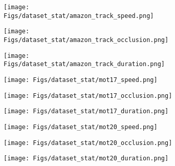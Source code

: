 \documentclass[runningheads]{llncs}
\begin{document}
\begin{figure}[t!]
\centering

    \begin{subfigure}{0.25\textwidth}
        \centering
        \texttt{[image: Figs/dataset\_stat/amazon\_track\_speed.png]}
    \end{subfigure}\begin{subfigure}{0.25\textwidth}
        \centering
        \texttt{[image: Figs/dataset\_stat/amazon\_track\_occlusion.png]}
    \end{subfigure}\begin{subfigure}{0.25\textwidth}
        \centering
        \texttt{[image: Figs/dataset\_stat/amazon\_track\_duration.png]}
    \end{subfigure}
    
\vspace{-1.2em}
    \begin{subfigure}{0.25\textwidth}
        \centering
        \texttt{[image: Figs/dataset\_stat/mot17\_speed.png]}
    \end{subfigure}\begin{subfigure}{0.25\textwidth}
        \centering
        \texttt{[image: Figs/dataset\_stat/mot17\_occlusion.png]}
    \end{subfigure}\begin{subfigure}{0.25\textwidth}
         \centering
         \texttt{[image: Figs/dataset\_stat/mot17\_duration.png]}
    \end{subfigure}

\vspace{-1.2em}
    \begin{subfigure}{0.25\textwidth}
        \centering
        \texttt{[image: Figs/dataset\_stat/mot20\_speed.png]}
    \end{subfigure}\begin{subfigure}{0.25\textwidth}
        \centering
        \texttt{[image: Figs/dataset\_stat/mot20\_occlusion.png]}
    \end{subfigure}\begin{subfigure}{0.25\textwidth}
         \centering
         \texttt{[image: Figs/dataset\_stat/mot20\_duration.png]}
    \end{subfigure}
    

\end{figure}
\end{document}

